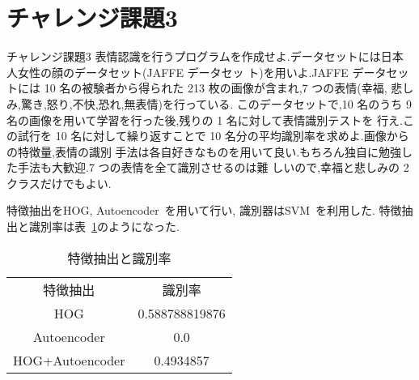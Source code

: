 \section{チャレンジ課題3}\label{section:challenge3}
\begin{itembox}{チャレンジ課題3}
  表情認識を行うプログラムを作成せよ.データセットには日本人女性の顔のデータセット(JAFFE データセッ ト)を用いよ.JAFFE データセットには 10 名の被験者から得られた 213 枚の画像が含まれ,7 つの表情(幸福, 悲しみ,驚き,怒り,不快,恐れ,無表情)を行っている.
  このデータセットで,10 名のうち 9 名の画像を用いて学習を行った後,残りの 1 名に対して表情識別テストを 行え.この試行を 10 名に対して繰り返すことで 10 名分の平均識別率を求めよ.画像からの特徴量,表情の識別 手法は各自好きなものを用いて良い.もちろん独自に勉強した手法も大歓迎.7 つの表情を全て識別させるのは難 しいので,幸福と悲しみの 2 クラスだけでもよい.
\end{itembox}

特徴抽出をHOG, Autoencoder~\cite{autoencoder}を用いて行い,
識別器はSVM~\cite{sklearn-svm}を利用した.
特徴抽出と識別率は表~\ref{tbl:feature-extraction-score}のようになった.

\begin{table}[htbp]
  \begin{center}
    \begin{tabular}{cc}
      特徴抽出 & 識別率 \\
      HOG & 0.588788819876  \\
      Autoencoder & 0.0 \\
      HOG+Autoencoder & 0.4934857  \\
    \end{tabular}
    \caption{特徴抽出と識別率}
    \label{tbl:feature-extraction-score}
  \end{center}
\end{table}
